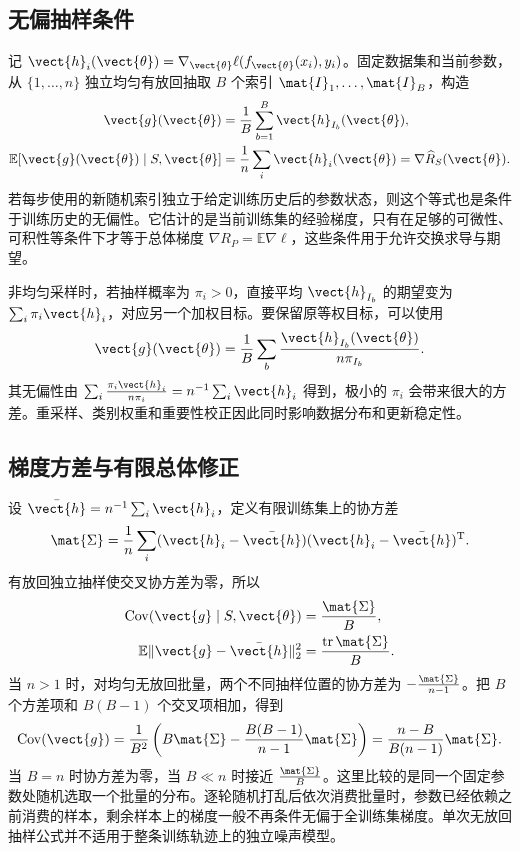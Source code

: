 \documentclass[../textbook.tex]{subfiles}
\begin{document}
\subsection{无偏抽样条件}
记 $\vect{h}_i(\vect{\theta})=\nabla_{\vect{\theta}}\ell(f_{\vect{\theta}}(x_i),y_i)$。固定数据集和当前参数，从 $\{1,\ldots,n\}$ 独立均匀有放回抽取 $B$ 个索引 $\mat{I}_1,\ldots,\mat{I}_B$，构造
\begin{equation}
\begin{aligned}
 \vect{g}(\vect{\theta}) &= \frac1B\sum_{b=1}^B \vect{h}_{I_b}(\vect{\theta}), \\
 \mathbb E[\vect{g}(\vect{\theta})\mid S,\vect{\theta}] &= \frac1n\sum_i \vect{h}_i(\vect{\theta})=\nabla\widehat R_S(\vect{\theta}).
\end{aligned}
\end{equation}
若每步使用的新随机索引独立于给定训练历史后的参数状态，则这个等式也是条件于训练历史的无偏性。它估计的是当前训练集的经验梯度，只有在足够的可微性、可积性等条件下才等于总体梯度 $\nabla R_P=\mathbb E\nabla\ell$，这些条件用于允许交换求导与期望。

非均匀采样时，若抽样概率为 $\pi_i>0$，直接平均 $\vect{h}_{I_b}$ 的期望变为 $\sum_i\pi_i \vect{h}_i$，对应另一个加权目标。要保留原等权目标，可以使用
\begin{equation}
 \vect{g}(\vect{\theta})=\frac1B\sum_b\frac{\vect{h}_{I_b}(\vect{\theta})}{n\pi_{I_b}}.
\end{equation}
其无偏性由 $\sum_i\frac{\pi_i \vect{h}_i}{n\pi_i}=n^{-1}\sum_i \vect{h}_i$ 得到，极小的 $\pi_i$ 会带来很大的方差。重采样、类别权重和重要性校正因此同时影响数据分布和更新稳定性。

\subsection{梯度方差与有限总体修正}
设 $\bar{\vect{h}}=n^{-1}\sum_i \vect{h}_i$，定义有限训练集上的协方差
\begin{equation}
 \mat{\Sigma}=\frac1n\sum_i(\vect{h}_i-\bar{\vect{h}})(\vect{h}_i-\bar{\vect{h}})^{\mathrm{T}}.
\end{equation}
有放回独立抽样使交叉协方差为零，所以
\begin{equation}\label{eq:opt-sgd-var}
\begin{aligned}
 \operatorname{Cov}(\vect{g}\mid S,\vect{\theta}) &= \frac{\mat{\Sigma}}{B}, \\
 \mathbb E\|\vect{g}-\bar{\vect{h}}\|_2^2 &= \frac{\operatorname{tr}\mat{\Sigma}}{B}.
\end{aligned}
\end{equation}
当 $n>1$ 时，对均匀无放回批量，两个不同抽样位置的协方差为 $-\frac{\mat{\Sigma}}{n-1}$。把 $B$ 个方差项和 $B(B-1)$ 个交叉项相加，得到
\begin{equation}
 \operatorname{Cov}(\vect{g})=\frac1{B^2}\left(B\mat{\Sigma}-\frac{B(B-1)}{n-1}\mat{\Sigma}\right)
 =\frac{n-B}{B(n-1)}\mat{\Sigma}.\label{eq:opt-fpc}
\end{equation}
当 $B=n$ 时协方差为零，当 $B\ll n$ 时接近 $\frac{\mat{\Sigma}}{B}$。这里比较的是同一个固定参数处随机选取一个批量的分布。逐轮随机打乱后依次消费批量时，参数已经依赖之前消费的样本，剩余样本上的梯度一般不再条件无偏于全训练集梯度。单次无放回抽样公式并不适用于整条训练轨迹上的独立噪声模型。
\end{document}
